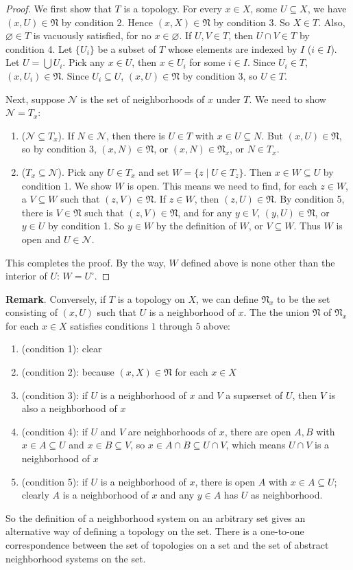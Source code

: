 \documentclass[12pt]{article}
\begin{document}
\begin{proof} We first show that $T$ is a topology.  For every $x\in X$, some $U\subseteq X$, we have $(x,U)\in \mathfrak{N}$ by condition 2.  Hence $(x,X)\in \mathfrak{N}$ by condition 3.  So $X\in T$.  Also, $\varnothing\in T$ is vacuously satisfied, for no $x\in \varnothing$.  If $U,V\in T$, then $U\cap V\in T$ by condition 4.  Let $\lbrace U_i\rbrace$ be a subset of $T$ whose elements are indexed by $I$ ($i\in I$).  Let $U=\bigcup U_i$.  Pick any $x\in U$, then $x\in U_i$ for some $i\in I$.  Since $U_i\in T$, $(x,U_i)\in \mathfrak{N}$.  Since $U_i\subseteq U$, $(x,U)\in \mathfrak{N}$ by condition 3, so $U\in T$. 

Next, suppose $\mathcal{N}$ is the set of neighborhoods of $x$ under $T$.  We need to show $\mathcal{N}=T_x$:
\begin{enumerate}
\item ($\mathcal{N}\subseteq T_x$).  If $N\in\mathcal{N}$, then there is $U\in T$ with $x\in U\subseteq N$.  But $(x,U)\in \mathfrak{N}$, so by condition 3, $(x,N)\in \mathfrak{N}$, or $(x,N)\in \mathfrak{N}_x$, or $N\in T_x$.
\item ($T_x\subseteq \mathcal{N}$).  Pick any $U\in T_x$ and set $W=\lbrace z\mid U\in T_z\rbrace$.  Then $x\in W\subseteq U$ by condition 1.  We show $W$ is open.  This means we need to find, for each $z\in W$, a $V\subseteq W$ such that $(z,V)\in \mathfrak{N}$.  If $z\in W$, then $(z,U)\in \mathfrak{N}$.  By condition 5, there is $V\in \mathfrak{N}$ such that $(z,V)\in \mathfrak{N}$, and for any $y\in V$, $(y,U)\in \mathfrak{N}$, or $y\in U$ by condition 1.  So $y\in W$ by the definition of $W$, or $V\subseteq W$.  Thus $W$ is open and $U\in \mathcal{N}$.
\end{enumerate}
This completes the proof.  By the way, $W$ defined above is none other than the interior of $U$: $W=U^{\circ}$.
\end{proof}

\textbf{Remark}.  
Conversely, if $T$ is a topology on $X$, we can define $\mathfrak{N}_x$ to be the set consisting of $(x,U)$ such that $U$ is a neighborhood of $x$.  The the union $\mathfrak{N}$ of $\mathfrak{N}_x$ for each $x\in X$ satisfies conditions $1$ through $5$ above: 
\begin{enumerate}
\item (condition 1): clear
\item (condition 2): because $(x,X)\in \mathfrak{N}$ for each $x\in X$
\item (condition 3): if $U$ is a neighborhood of $x$ and $V$ a supserset of $U$, then $V$ is also a neighborhood of $x$
\item (condition 4): if $U$ and $V$ are neighborhoods of $x$, there are open $A,B$ with $x\in A\subseteq U$ and $x\in B\subseteq V$, so $x\in A\cap B\subseteq U\cap V$, which means $U\cap V$ is a neighborhood of $x$
\item (condition 5): if $U$ is a neighborhood of $x$, there is open $A$ with $x\in A\subseteq U$; clearly $A$ is a neighborhood of $x$ and any $y\in A$ has $U$ as neighborhood.
\end{enumerate}

So the definition of a neighborhood system on an arbitrary set gives an alternative way of defining a topology on the set.  There is a one-to-one correspondence between the set of topologies on a set and the set of abstract  neighborhood systems on the set.
\end{document}
